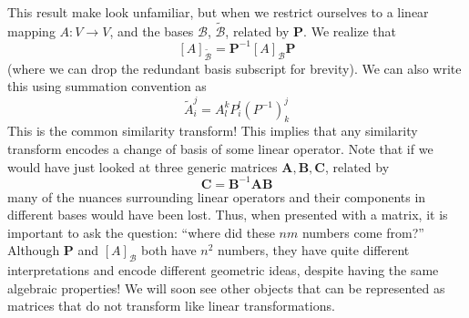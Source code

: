 \documentclass[a4paper]{article}
\begin{document}
This result make look unfamiliar, but when we restrict ourselves to a linear mapping $A: V \rightarrow V$, and the bases $\mathcal{B}$, $\widetilde{\mathcal{B}}$, related by $\bm{P}$. We realize that
\[
  \left[ A \right]_{\widetilde{\mathcal{B}}} = \bm{P}^{-1}\left[ A \right]_{\mathcal{B}}\bm{P}
\]
(where we can drop the redundant basis subscript for brevity). We can also write this using summation convention as
\[
  \tilde{A}_i^j = A_l^k P_i^l (P^{-1})_k^j
\] 
This is the common similarity transform! This implies that any similarity transform encodes a change of basis of some linear operator. Note that if we would have just looked at three generic matrices $\bm{A}, \bm{B}, \bm{C}$, related by
\[
  \bm{C} = \bm{B}^{-1} \bm{A} \bm{B}
\]
many of the nuances surrounding linear operators and their components in different bases would have been lost. Thus, when presented with a matrix, it is important to ask the question: ``where did these $nm$ numbers come from?'' Although $\bm{P}$ and $[A]_{\mathcal{B}}$ both have $n^2$ numbers, they have quite different interpretations and encode different geometric ideas, despite having the same algebraic properties! We will soon see other objects that can be represented as matrices that do not transform like linear transformations.
\end{document}
